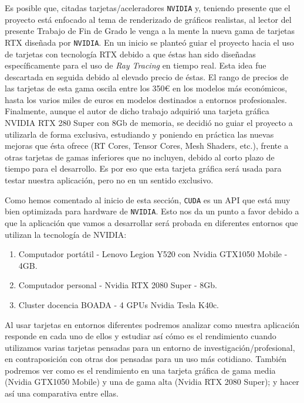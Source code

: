 \documentclass[titlepage,12pt]{report}
\begin{document}
Es posible que, citadas tarjetas/aceleradores \texttt{NVIDIA} y, teniendo presente que el proyecto está enfocado al tema de renderizado de gráficos realistas, al lector del presente Trabajo de Fin de Grado le venga a la mente la nueva gama de tarjetas RTX diseñada por \texttt{NVIDIA}. En un inicio se planteó guiar el proyecto hacia el uso de tarjetas con tecnología RTX debido a que éstas han sido diseñadas específicamente para el uso de \textit{Ray Tracing} en tiempo real. Esta idea fue descartada en seguida debido al elevado precio de éstas. El rango de precios de las tarjetas de esta gama oscila entre los 350€ en los modelos más económicos, hasta los varios miles de euros en modelos destinados a entornos profesionales. Finalmente, aunque el autor de dicho trabajo adquirió una tarjeta gráfica NVIDIA RTX 280 Super con 8Gb de memoria, se decidió no guiar el proyecto a utilizarla de forma exclusiva, estudiando y poniendo en práctica las nuevas mejoras que ésta ofrece (RT Cores, Tensor Cores, Mesh Shaders, etc.), frente a otras tarjetas de gamas inferiores que no incluyen, debido al corto plazo de tiempo para el desarrollo. Es por eso que esta tarjeta gráfica será usada para testar nuestra aplicación, pero no en un sentido exclusivo.

Como hemos comentado al inicio de esta sección, \texttt{CUDA} es un API que está muy bien optimizada para hardware de \texttt{NVIDIA}. Esto nos da un punto a favor debido a que la aplicación que vamos a desarrollar será probada en diferentes entornos que utilizan la tecnología de NVIDIA:

\begin{enumerate}
	\item Computador portátil - Lenovo Legion Y520 con Nvidia GTX1050 Mobile - 4GB.
	\item Computador personal - Nvidia RTX 2080 Super - 8Gb.
	\item Cluster docencia BOADA - 4 GPUs Nvidia Tesla K40c.
\end{enumerate}

Al usar tarjetas en entornos diferentes podremos analizar como nuestra aplicación responde en cada uno de ellos y estudiar así cómo es el rendimiento cuando utilizamos varias tarjetas pensadas para un entorno de investigación/profesional, en contraposición con otras dos pensadas para un uso más cotidiano. También podremos ver como es el rendimiento en una tarjeta gráfica de gama media (Nvidia GTX1050 Mobile) y una de gama alta (Nvidia RTX 2080 Super); y hacer así una comparativa entre ellas.
\end{document}
